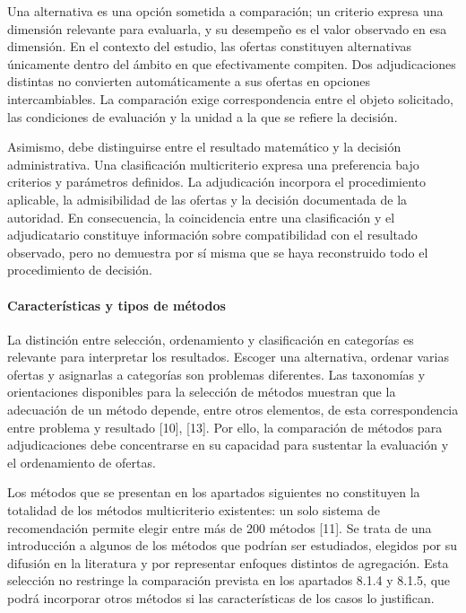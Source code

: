 \documentclass[12pt,a4paper]{article}
\begin{document}
Una alternativa es una opción sometida a comparación; un criterio expresa una dimensión relevante para evaluarla, y su desempeño es el valor observado en esa dimensión. En el contexto del estudio, las ofertas constituyen alternativas únicamente dentro del ámbito en que efectivamente compiten. Dos adjudicaciones distintas no convierten automáticamente a sus ofertas en opciones intercambiables. La comparación exige correspondencia entre el objeto solicitado, las condiciones de evaluación y la unidad a la que se refiere la decisión.

Asimismo, debe distinguirse entre el resultado matemático y la decisión administrativa. Una clasificación multicriterio expresa una preferencia bajo criterios y parámetros definidos. La adjudicación incorpora el procedimiento aplicable, la admisibilidad de las ofertas y la decisión documentada de la autoridad. En consecuencia, la coincidencia entre una clasificación y el adjudicatario constituye información sobre compatibilidad con el resultado observado, pero no demuestra por sí misma que se haya reconstruido todo el procedimiento de decisión.

\paragraph{Características y tipos de métodos}

La distinción entre selección, ordenamiento y clasificación en categorías es relevante para interpretar los resultados. Escoger una alternativa, ordenar varias ofertas y asignarlas a categorías son problemas diferentes. Las taxonomías y orientaciones disponibles para la selección de métodos muestran que la adecuación de un método depende, entre otros elementos, de esta correspondencia entre problema y resultado [10], [13]. Por ello, la comparación de métodos para adjudicaciones debe concentrarse en su capacidad para sustentar la evaluación y el ordenamiento de ofertas.


Los métodos que se presentan en los apartados siguientes no constituyen la totalidad de los métodos multicriterio existentes: un solo sistema de recomendación permite elegir entre más de 200 métodos [11]. Se trata de una introducción a algunos de los métodos que podrían ser estudiados, elegidos por su difusión en la literatura y por representar enfoques distintos de agregación. Esta selección no restringe la comparación prevista en los apartados 8.1.4 y 8.1.5, que podrá incorporar otros métodos si las características de los casos lo justifican.
\end{document}

